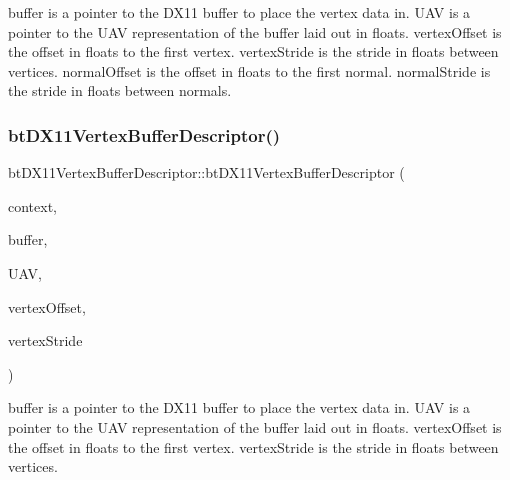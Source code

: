 buffer is a pointer to the D\+X11 buffer to place the vertex data in. U\+AV is a pointer to the U\+AV representation of the buffer laid out in floats. vertex\+Offset is the offset in floats to the first vertex. vertex\+Stride is the stride in floats between vertices. normal\+Offset is the offset in floats to the first normal. normal\+Stride is the stride in floats between normals. \mbox{\label{classbtDX11VertexBufferDescriptor_af395186594c4954fb48971cd7e1eb2b8}} 
\subsubsection{\texorpdfstring{bt\+D\+X11\+Vertex\+Buffer\+Descriptor()}{btDX11VertexBufferDescriptor()}\hspace{0.1cm}{\footnotesize\ttfamily [3/4]}}
{\footnotesize\ttfamily bt\+D\+X11\+Vertex\+Buffer\+Descriptor\+::bt\+D\+X11\+Vertex\+Buffer\+Descriptor (\begin{DoxyParamCaption}\item[{I\+D3\+D11\+Device\+Context $\ast$}]{context,  }\item[{I\+D3\+D11\+Buffer $\ast$}]{buffer,  }\item[{I\+D3\+D11\+Unordered\+Access\+View $\ast$}]{U\+AV,  }\item[{int}]{vertex\+Offset,  }\item[{int}]{vertex\+Stride }\end{DoxyParamCaption})\hspace{0.3cm}{\ttfamily [inline]}}

buffer is a pointer to the D\+X11 buffer to place the vertex data in. U\+AV is a pointer to the U\+AV representation of the buffer laid out in floats. vertex\+Offset is the offset in floats to the first vertex. vertex\+Stride is the stride in floats between vertices. \mbox{\label{classbtDX11VertexBufferDescriptor_a85ff10c8bcf97f7109496411d2eded6e}} 
